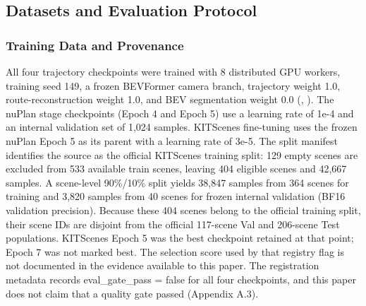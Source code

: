 \documentclass[
  english,
  10pt,
]{article}
\begin{document}
\subsection{Datasets and Evaluation
Protocol}\label{datasets-and-evaluation-protocol}

\subsubsection{Training Data and
Provenance}\label{training-data-and-provenance}

All four trajectory checkpoints were trained with 8 distributed GPU
workers, training seed 149, a frozen BEVFormer camera branch, trajectory
weight 1.0, route-reconstruction weight 1.0, and BEV segmentation weight
0.0 (\hyperref[tab-config]{}, \hyperref[fig-protocol]{}). The nuPlan
\hyperref[ref-nuplan]{}stage checkpoints (Epoch 4 and Epoch 5) use a
learning rate of 1e-4 and an internal validation set of 1,024 samples.
KITScenes \hyperref[ref-kitscenes]{}fine-tuning uses the frozen nuPlan
Epoch 5 as its parent with a learning rate of 3e-5. The split manifest
identifies the source as the official KITScenes training split: 129
empty scenes are excluded from 533 available train scenes, leaving 404
eligible scenes and 42,667 samples. A scene-level 90\%/10\% split yields
38,847 samples from 364 scenes for training and 3,820 samples from 40
scenes for frozen internal validation (BF16 validation precision).
Because these 404 scenes belong to the official training split, their
scene IDs are disjoint from the official 117-scene Val and 206-scene
Test populations. KITScenes Epoch 5 was the best checkpoint retained at
that point; Epoch 7 was not marked best. The selection score used by
that registry flag is not documented in the evidence available to this
paper. The registration metadata records eval\_gate\_pass = false for
all four checkpoints, and this paper does not claim that a quality gate
passed (Appendix A.3).
\end{document}
